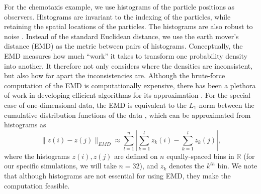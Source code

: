 \documentclass[preprint]{elsarticle}
\begin{document}
For the chemotaxis example, we use histograms of the particle positions as observers. 
%
Histograms are invariant to the indexing of the particles, while retaining the spatial locations of the particles.
%
The histograms are also robust to noise \cite{talmon2013empirical}. 
%
Instead of the standard Euclidean distance, we use the earth mover's distance (EMD) \cite{rubner2000earth} as the metric between pairs of histograms. 
%
Conceptually, the EMD measures how much ``work'' it takes to transform one probability density into another.
%
It therefore not only considers where the densities are inconsistent, but also how far apart the inconsistencies are.
%
Although the brute-force computation of the EMD is computationally expensive, there has been a plethora of work in developing efficient algorithms for its approximation \cite{Pele-eccv2008, Pele-iccv2009}.
%
For the special case of one-dimensional data, the EMD is equivalent to the $L_1$-norm between the cumulative distribution functions of the data \cite{rubner2000perceptual}, which can be approximated from histograms as
\begin{equation}
\| z(i) - z(j) \|_{EMD} \approx \sum_{l=1}^{n} \left| \sum_{k=1}^l z_k(i) - \sum_{k=1}^l z_k(j) \right|,
\end{equation}
where the histograms $z(i), z(j)$ are defined on $n$ equally-spaced bins in $\mathbb{R}$ (for our specific simulations, we will take $n=32$), and $z_k$ denotes the $k^{th}$ bin. 
%
We note that although histograms are not essential for using EMD, they make the computation feasible. 
%
\end{document}
